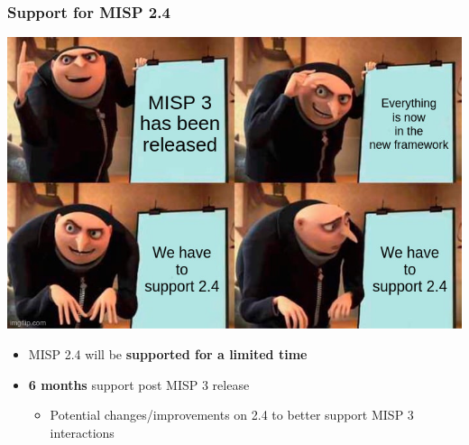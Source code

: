 \begin{frame}
    \frametitle{Support for MISP 2.4}
    \begin{center}
        \includegraphics[width=0.6\linewidth]{pictures/support-for-2.jpeg}
    \end{center}
    \begin{itemize}
        \item MISP 2.4 will be \textbf{supported for a limited time}
        \item \textbf{6 months} support post MISP 3 release
        \begin{itemize}
            \item Potential changes/improvements on 2.4 to better support MISP 3 interactions
        \end{itemize}
    \end{itemize}
\end{frame}

